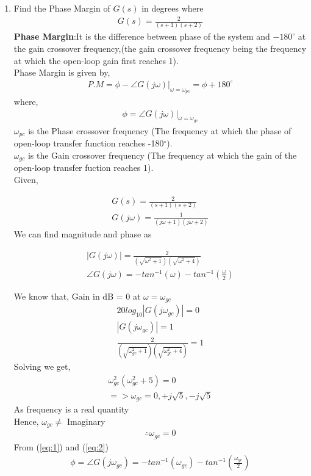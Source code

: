 \begin{enumerate}[label=\thesection.\arabic*.,ref=\thesection.\theenumi]

\item
Find the Phase Margin of $G(s)$ in degrees where
\begin{align}
G(s) = \frac{2}{(s+1)(s+2)}
\label{eq:12}
\end{align}
\solution \textbf{Phase Margin}:It is the difference between phase of the system and $-180^{\circ}$ at the gain crossover frequency,(the gain crossover frequency being the frequency at which the open-loop gain first reaches 1).\\
Phase Margin is given by,
\begin{align}
P.M=\phi-\angle G(j\omega)|_{\omega=\omega_{pc}}=\phi+180^{\circ}
\end{align}
where,
\begin{align}
\phi=\angle G(j\omega)|_{\omega=\omega_{gc}}
\label{eq:1}
\end{align}
$\omega_{pc}$ is the Phase crossover frequency (The frequency at which the phase of open-loop transfer function reaches -180$^{\circ}$).\\
$\omega_{gc}$ is the Gain crossover frequency (The frequency at which the gain of the open-loop transfer fuction reaches 1).\\
Given,

\begin{align}
G(s) = \frac{2}{(s+1)(s+2)} 
\\
G(j\omega)=\frac{1}{(j\omega+1)(j\omega+2)} 
\end{align}
We can find magnitude and phase as

\begin{align}
|G(j\omega)|=\frac{2}{(\sqrt{\omega^2+1})(\sqrt{\omega^2+4})}
\\
\angle G(j\omega)=- tan^{-1}(\omega) - tan^{-1}(\frac{\omega}{2}) \label{eq:2}
\end{align}

We know that,
Gain in dB = 0 at $\omega=\omega_{gc}$
\begin{align}
20log_{10}|G(j\omega_{gc})|=0 
\\
|G(j\omega_{gc})|=1
\\
\frac{2}{(\sqrt{\omega_{gc}^2+1})(\sqrt{\omega_{gc}^2+4})}=1
\end{align}
Solving we get,
\begin{align}
\omega^2_{gc}(\omega^2_{gc}+5)=0
\\
=> \omega_{gc}=0,+j\sqrt{5},-j\sqrt{5}
\end{align}
As frequency is a real quantity
\\Hence, $\omega_{gc} \neq$ Imaginary
\begin{align}
\therefore  \omega_{gc} =0
\end{align}
From (\ref{eq:1}) and (\ref{eq:2})
\begin{align}
\phi= \angle G(j\omega_{gc})= -tan^{-1}(\omega_{gc})-tan^{-1}(\frac{\omega_{gc}}{2})
\end{align}


\end{enumerate}
